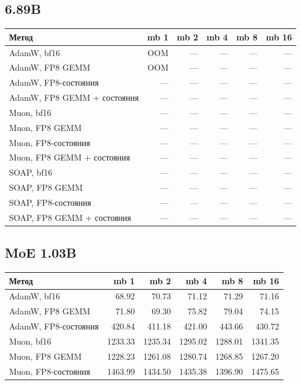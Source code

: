 \documentclass[10pt]{article}
\begin{document}
\subsection{6.89B}
\begin{center}
\small
\begin{tabular}{lrrrrr}
\toprule
\textbf{Метод} & \textbf{mb 1} & \textbf{mb 2} & \textbf{mb 4} & \textbf{mb 8} & \textbf{mb 16} \\
\midrule
AdamW, bf16 & \textcolor{oomgray}{OOM} & --- & --- & --- & --- \\
AdamW, FP8 GEMM & \textcolor{oomgray}{OOM} & --- & --- & --- & --- \\
AdamW, FP8-состояния & --- & --- & --- & --- & --- \\
AdamW, FP8 GEMM + состояния & --- & --- & --- & --- & --- \\
Muon, bf16 & --- & --- & --- & --- & --- \\
Muon, FP8 GEMM & --- & --- & --- & --- & --- \\
Muon, FP8-состояния & --- & --- & --- & --- & --- \\
Muon, FP8 GEMM + состояния & --- & --- & --- & --- & --- \\
SOAP, bf16 & --- & --- & --- & --- & --- \\
SOAP, FP8 GEMM & --- & --- & --- & --- & --- \\
SOAP, FP8-состояния & --- & --- & --- & --- & --- \\
SOAP, FP8 GEMM + состояния & --- & --- & --- & --- & --- \\
\bottomrule
\end{tabular}
\end{center}
\subsection{MoE 1.03B}
\begin{center}
\small
\begin{tabular}{lrrrrr}
\toprule
\textbf{Метод} & \textbf{mb 1} & \textbf{mb 2} & \textbf{mb 4} & \textbf{mb 8} & \textbf{mb 16} \\
\midrule
AdamW, bf16 & 68.92 & 70.73 & 71.12 & 71.29 & 71.16 \\
AdamW, FP8 GEMM & 71.80 & 69.30 & 75.82 & 79.04 & 74.15 \\
AdamW, FP8-состояния & 420.84 & 411.18 & 421.00 & 443.66 & 430.72 \\
Muon, bf16 & 1233.33 & 1235.34 & 1295.02 & 1288.01 & 1341.35 \\
Muon, FP8 GEMM & 1228.23 & 1261.08 & 1280.74 & 1268.85 & 1267.20 \\
Muon, FP8-состояния & 1463.99 & 1434.50 & 1435.38 & 1396.90 & 1475.65 \\
\bottomrule
\end{tabular}
\end{center}
\end{document}

